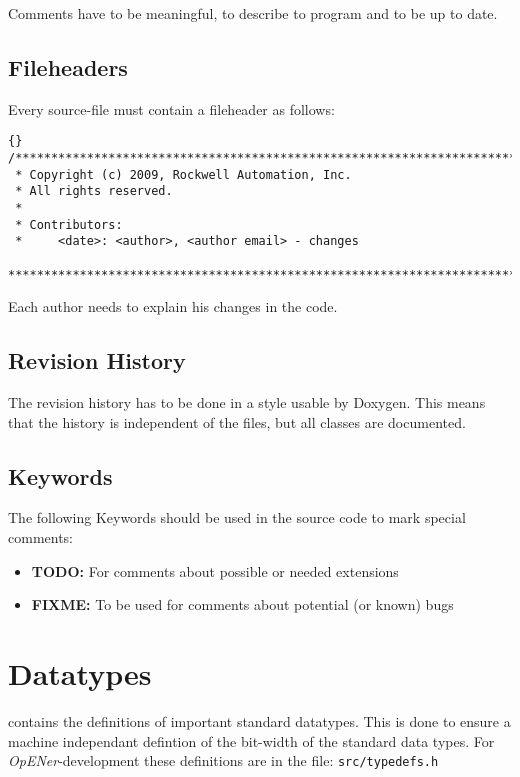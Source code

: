 \documentclass[final,a4paper,10pt, oneside]{article}
\begin{document}
Comments have to be meaningful, to describe to program and to be up to date.


\subsection{Fileheaders}
Every source-file must contain a fileheader as follows:
\begin{lstlisting}[frame=trbl]{}
/*******************************************************************************
 * Copyright (c) 2009, Rockwell Automation, Inc.
 * All rights reserved. 
 *
 * Contributors:
 *     <date>: <author>, <author email> - changes
 ******************************************************************************/
\end{lstlisting}
Each author needs to explain his changes in the code. 
\subsection{Revision History}
The revision history has to be done in a style  usable by Doxygen. This means that the history is independent of the files, but all classes are documented.

\subsection{Keywords}
The following Keywords should be used in the source code to mark special comments:
\begin{itemize}
	\item \textbf{TODO:} For comments about possible or needed extensions
	\item \textbf{FIXME:} To be used for comments about potential (or known) bugs
\end{itemize}

\section{Datatypes}
 contains the definitions of important standard datatypes. This is done to ensure a machine independant defintion of the bit-width of the standard data types. For \emph{OpENer}-development these definitions are in the file: \verb|src/typedefs.h|
\end{document}
